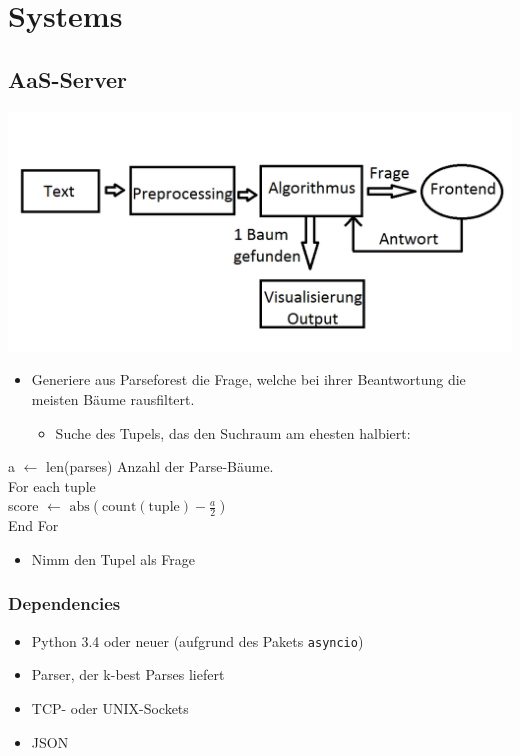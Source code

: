 \documentclass{scrartcl}
\begin{document}
\section{Systems}
\label{sec:Systems}

\subsection{AaS-Server}
\label{sub:AaS-Server}

    \includegraphics[scale=0.4]{Grafik}
    \begin{itemize}
        \item Generiere aus Parseforest die Frage, welche bei ihrer Beantwortung die meisten Bäume rausfiltert.
            \begin{itemize}
                \item Suche des Tupels, das den Suchraum am ehesten halbiert:
            \end{itemize}
    \end{itemize}

        a $\gets$ len(parses) Anzahl der Parse-Bäume. \\
        For each tuple \\
        score $\gets$ $\mathrm{abs}(\mathrm{count(tuple)} - \frac{a}{2})$ \\
        End For

    \begin{itemize}
        \item Nimm den Tupel als Frage
    \end{itemize}


\subsubsection{Dependencies}
\label{ssub:Server-Dependencies}

    \begin{itemize}
        \item Python 3.4 oder neuer (aufgrund des Pakets \texttt{asyncio})
        \item Parser, der k-best Parses liefert
        \item TCP- oder UNIX-Sockets
        \item JSON
    \end{itemize}
\end{document}

